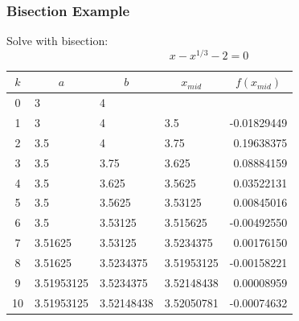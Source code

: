 \documentclass[10pt]{beamer}
\begin{document}
\begin{frame}
\frametitle{Bisection Example}

Solve with bisection:
\begin{equation*}
    x - x^{1/3} - 2 = 0
\end{equation*}

\vspace{2ex}
\begin{center}
  \small
  \renewcommand{\arraystretch}{1.3}
    \begin{tabular}{clllr}
     $k$ & \multicolumn{1}{c}{$a$}
         & \multicolumn{1}{c}{$b$}
         &  \multicolumn{1}{c}{$x_{mid}$}
         & \multicolumn{1}{c}{$f(x_{mid})$} \\ \hline
      0 &  3           & 4          &             &             \\
      1 &  3           & 4          & 3.5         & -0.01829449 \\
      2 &  3.5         & 4          & 3.75        &  0.19638375 \\
      3 &  3.5         & 3.75       & 3.625       &  0.08884159 \\
      4 &  3.5         & 3.625      & 3.5625      &  0.03522131 \\
      5 &  3.5         & 3.5625     & 3.53125     &  0.00845016 \\
      6 &  3.5         & 3.53125    & 3.515625    & -0.00492550 \\
      7 &  3.51625     & 3.53125    & 3.5234375   &  0.00176150 \\
      8 &  3.51625     & 3.5234375  & 3.51953125  & -0.00158221 \\
      9 &  3.51953125  & 3.5234375  & 3.52148438  &  0.00008959 \\
     10 &  3.51953125  & 3.52148438 & 3.52050781  & -0.00074632 \\
    \end{tabular}
\end{center}




\end{frame}
\end{document}
